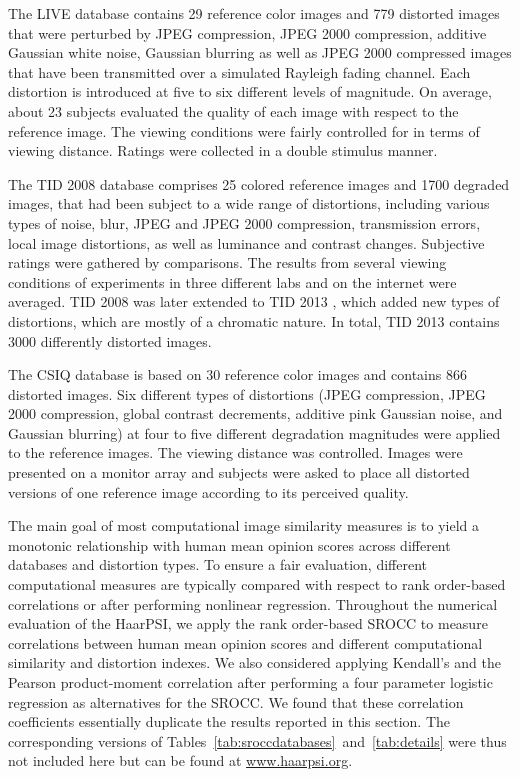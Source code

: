 \documentclass[11pt,a4paper]{article}
\begin{document}
The LIVE database \cite{SWCBOnline} contains 29 reference color images and 779 distorted images that were perturbed by JPEG compression, JPEG 2000 compression, additive Gaussian white
noise, Gaussian blurring as well as JPEG 2000 compressed images that have been transmitted over a simulated Rayleigh fading channel. Each distortion is introduced at five to six different levels of magnitude. On average, about 23 subjects evaluated the quality of each image with respect to the reference image. The viewing conditions were fairly controlled for in terms of viewing distance. Ratings were collected in a double stimulus manner.
 

The TID 2008 database \cite{PLZECB2009} comprises 25 colored reference images and 1700 degraded images, that had been subject to a wide range of distortions, including various types of noise, blur, JPEG and JPEG 2000 compression, transmission errors, local image distortions, as well as luminance and contrast changes. Subjective ratings were gathered by comparisons. The results from several viewing conditions of experiments in three different labs and on the internet were averaged. TID 2008 was later extended to TID 2013 \cite{Ponomarenko2015}, which added new types of distortions, which are mostly of a chromatic nature. In total, TID 2013 contains 3000 differently distorted images.

The CSIQ database \cite{LaCh2010} is based on 30 reference color images and contains 866 distorted images. Six different types of distortions (JPEG compression, JPEG 2000 compression, global contrast decrements, additive pink Gaussian noise, and Gaussian blurring) at four to five different degradation magnitudes were applied to the reference images. The viewing distance was controlled. Images were presented on a monitor array and subjects were asked to place all distorted versions of one reference image according to its perceived quality.

The main goal of most computational image similarity measures is to yield a monotonic relationship with human mean opinion scores across different databases and distortion types. To ensure a fair evaluation, different computational measures are typically compared with respect to rank order-based correlations or after performing nonlinear regression. Throughout the numerical evaluation of the HaarPSI, we apply the rank order-based SROCC to measure correlations between human mean opinion scores and different computational similarity and distortion indexes. We also considered applying Kendall's  and the Pearson product-moment correlation after performing a four parameter logistic regression as alternatives for the SROCC. We found that these correlation coefficients essentially duplicate the results reported in this section. The corresponding versions of Tables~\ref{tab:sroccdatabases}~and~\ref{tab:details} were thus not included here but can be found at \url{www.haarpsi.org}.
\end{document}
